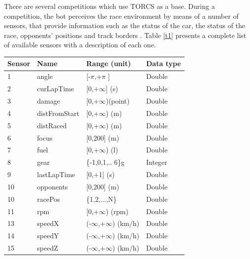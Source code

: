 \documentclass[runningheads,a4paper]{llncs}
\begin{document}
	There are several competitions which use TORCS as a base. During a competition, the bot perceives the race environment by means of a number of sensors, that provide information such as the status of the car, the status of the race, opponents' positions and track borders \cite{manualTORCS,torcs2}.
	Table \ref{t1} presents a complete list of available sensors with a description of each one.
	
	\begin{table}[ht!]
		{\scriptsize
			{\centering
				\begin{tabular}{|p{2cm}|p{3cm}|p{3 cm}|p{3 cm}|}
					\hline
					{\textbf{Sensor} }&
					{\textbf{Name} }&
					{\textbf{Range} (unit)} &  
					{\textbf{Data type}}\\ 
					\hline
					1 & angle & [-$\pi$,+$\pi$ ] & Double\\ 
					\hline
					2 & curLapTime & [0,+$\infty$] (s)	& Double\\ 
					\hline 
					3 & damage & [0,+$\infty$)(point)& Double\\ 
					\hline 
					4 & distFromStart & [0,+$\infty$) (m)& Double \\ 
					\hline 
					5 & distRaced &[0,+$\infty$) (m)& Double\\
					\hline 
					
					6 & focus & [0,200] (m)& Double\\
					\hline 
					
					7 & fuel & [0,+$\infty$) (l)& Double\\
					
					\hline
					8 & gear & \{-1,0,1,.. 6\}g& Integer \\
					
					\hline
					9 & lastLapTime &[0,+1] (s) & Double \\
					
					\hline
					10 & opponents &[0,200] (m)& Double \\
					
					\hline
					10 & racePos & \{1,2,...,N\} & Double \\
					\hline
					11 & rpm    & [0,+$\infty$) (rpm)   & Double \\
					\hline  
					13 & speedX & (-$\infty$,+$\infty$) (km/h) & Double\\
					\hline  
					14 & speedY &(-$\infty$,+$\infty$) (km/h)  & Double\\
					\hline 
					15 & speedZ & (-$\infty$,+$\infty$) (km/h) & Double \\
					

\end{tabular}}}
\end{table}
\end{document}
